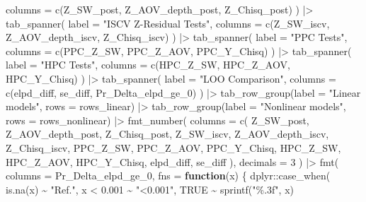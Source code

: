 \documentclass[
  english,
  letterpaper,
  DIV=11,
  numbers=noendperiod]{scrartcl}
\newenvironment{Shaded}{\begin{snugshade}}{\end{snugshade}}
\newcommand{\AttributeTok}[1]{\textcolor[rgb]{0.40,0.45,0.13}{#1}}
\newcommand{\ConstantTok}[1]{\textcolor[rgb]{0.56,0.35,0.01}{#1}}
\newcommand{\ControlFlowTok}[1]{\textcolor[rgb]{0.00,0.23,0.31}{\textbf{#1}}}
\newcommand{\DecValTok}[1]{\textcolor[rgb]{0.68,0.00,0.00}{#1}}
\newcommand{\FloatTok}[1]{\textcolor[rgb]{0.68,0.00,0.00}{#1}}
\newcommand{\FunctionTok}[1]{\textcolor[rgb]{0.28,0.35,0.67}{#1}}
\newcommand{\NormalTok}[1]{\textcolor[rgb]{0.00,0.23,0.31}{#1}}
\newcommand{\SpecialCharTok}[1]{\textcolor[rgb]{0.37,0.37,0.37}{#1}}
\newcommand{\StringTok}[1]{\textcolor[rgb]{0.13,0.47,0.30}{#1}}
\begin{document}
\begin{Shaded}
\begin{Highlighting}[]
    \AttributeTok{columns =} \FunctionTok{c}\NormalTok{(Z\_SW\_post, Z\_AOV\_depth\_post, Z\_Chisq\_post)}
\NormalTok{  ) }\SpecialCharTok{|\textgreater{}}
  \FunctionTok{tab\_spanner}\NormalTok{(}
    \AttributeTok{label =} \StringTok{"ISCV Z{-}Residual Tests"}\NormalTok{,}
    \AttributeTok{columns =} \FunctionTok{c}\NormalTok{(Z\_SW\_iscv, Z\_AOV\_depth\_iscv, Z\_Chisq\_iscv)}
\NormalTok{  ) }\SpecialCharTok{|\textgreater{}}
  \FunctionTok{tab\_spanner}\NormalTok{(}
    \AttributeTok{label =} \StringTok{"PPC Tests"}\NormalTok{,}
    \AttributeTok{columns =} \FunctionTok{c}\NormalTok{(PPC\_Z\_SW, PPC\_Z\_AOV, PPC\_Y\_Chisq)}
\NormalTok{  ) }\SpecialCharTok{|\textgreater{}}
  \FunctionTok{tab\_spanner}\NormalTok{(}
    \AttributeTok{label =} \StringTok{"HPC Tests"}\NormalTok{,}
    \AttributeTok{columns =} \FunctionTok{c}\NormalTok{(HPC\_Z\_SW, HPC\_Z\_AOV, HPC\_Y\_Chisq)}
\NormalTok{  ) }\SpecialCharTok{|\textgreater{}}
  \FunctionTok{tab\_spanner}\NormalTok{(}
    \AttributeTok{label =} \StringTok{"LOO Comparison"}\NormalTok{,}
    \AttributeTok{columns =} \FunctionTok{c}\NormalTok{(elpd\_diff, se\_diff, Pr\_Delta\_elpd\_ge\_0)}
\NormalTok{  ) }\SpecialCharTok{|\textgreater{}}
  \FunctionTok{tab\_row\_group}\NormalTok{(}\AttributeTok{label =} \StringTok{"Linear models"}\NormalTok{, }\AttributeTok{rows =}\NormalTok{ rows\_linear) }\SpecialCharTok{|\textgreater{}}
  \FunctionTok{tab\_row\_group}\NormalTok{(}\AttributeTok{label =} \StringTok{"Nonlinear models"}\NormalTok{, }\AttributeTok{rows =}\NormalTok{ rows\_nonlinear) }\SpecialCharTok{|\textgreater{}}
  \FunctionTok{fmt\_number}\NormalTok{(}
    \AttributeTok{columns =} \FunctionTok{c}\NormalTok{(}
\NormalTok{      Z\_SW\_post, Z\_AOV\_depth\_post, Z\_Chisq\_post,}
\NormalTok{      Z\_SW\_iscv, Z\_AOV\_depth\_iscv, Z\_Chisq\_iscv,}
\NormalTok{      PPC\_Z\_SW, PPC\_Z\_AOV, PPC\_Y\_Chisq,}
\NormalTok{      HPC\_Z\_SW, HPC\_Z\_AOV, HPC\_Y\_Chisq,}
\NormalTok{      elpd\_diff, se\_diff}
\NormalTok{    ),}
    \AttributeTok{decimals =} \DecValTok{3}
\NormalTok{  ) }\SpecialCharTok{|\textgreater{}}
  \FunctionTok{fmt}\NormalTok{(}
    \AttributeTok{columns =}\NormalTok{ Pr\_Delta\_elpd\_ge\_0,}
    \AttributeTok{fns =} \ControlFlowTok{function}\NormalTok{(x) \{}
\NormalTok{      dplyr}\SpecialCharTok{::}\FunctionTok{case\_when}\NormalTok{(}
        \FunctionTok{is.na}\NormalTok{(x) }\SpecialCharTok{\textasciitilde{}} \StringTok{"Ref."}\NormalTok{,}
\NormalTok{        x }\SpecialCharTok{\textless{}} \FloatTok{0.001} \SpecialCharTok{\textasciitilde{}} \StringTok{"\textless{}0.001"}\NormalTok{,}
        \ConstantTok{TRUE} \SpecialCharTok{\textasciitilde{}} \FunctionTok{sprintf}\NormalTok{(}\StringTok{"\%.3f"}\NormalTok{, x)}

\end{Highlighting}
\end{Shaded}
\end{document}
